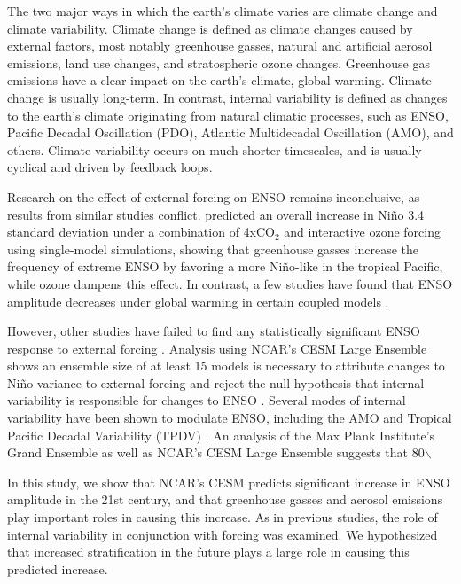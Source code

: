 \documentclass[11pt]{article}
\begin{document}
The two major ways in which the earth's climate varies are climate change and climate variability. Climate change is defined as climate changes caused by external factors, most notably greenhouse gasses, natural and artificial aerosol emissions, land use changes, and stratospheric ozone changes. Greenhouse gas emissions have a clear impact on the earth's climate, global warming. Climate change is usually long-term. In contrast, internal variability is defined as changes to the earth's climate originating from natural climatic processes, such as ENSO, Pacific Decadal Oscillation (PDO), Atlantic Multidecadal Oscillation (AMO), and others. Climate variability occurs on much shorter timescales, and is usually cyclical and driven by feedback loops.

Research on the effect of external forcing on ENSO remains inconclusive, as results from similar studies conflict. \citet{nowack2017role} predicted an overall increase in Niño 3.4 standard deviation under a combination of 4xCO\(_2\) and interactive ozone forcing using single-model simulations, showing that greenhouse gasses increase the frequency of extreme ENSO by favoring a more Niño-like in the tropical Pacific, while ozone dampens this effect. In contrast, a few studies have found that ENSO amplitude decreases under global warming in certain coupled models \citep{kohyama2018weakening}.

However, other studies have failed to find any statistically significant ENSO response to external forcing \citep{stevenson2012significant}. Analysis using NCAR's CESM Large Ensemble shows an ensemble size of at least 15 models is necessary to attribute changes to Niño variance to external forcing and reject the null hypothesis that internal variability is responsible for changes to ENSO \citep{zheng2018response}. Several modes of internal variability have been shown to modulate ENSO, including the AMO \citep{levine2017impact} and Tropical Pacific Decadal Variability (TPDV) \citep{zheng2018response}. An analysis of the Max Plank Institute's Grand Ensemble as well as NCAR's CESM Large Ensemble suggests that 80$\backslash$%

In this study, we show that NCAR's CESM predicts significant increase in ENSO amplitude in the 21st century, and that greenhouse gasses and aerosol emissions play important roles in causing this increase. As in previous studies, the role of internal variability in conjunction with forcing was examined. We hypothesized that increased stratification in the future plays a large role in causing this predicted increase.
\end{document}
